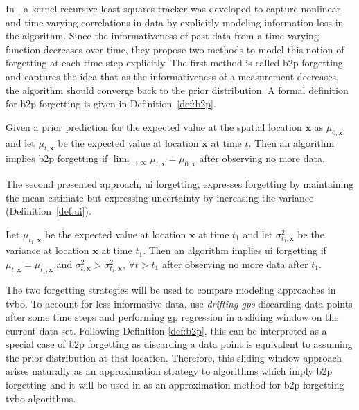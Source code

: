 In \textcite{Vaerenbergh_2012}, a kernel recursive least squares tracker was developed to capture nonlinear and time-varying correlations in data by explicitly modeling information loss in the algorithm. Since the informativeness of past data from a time-varying function decreases over time, they propose two methods to model this notion of forgetting at each time step explicitly. The first method is called \gls{b2p} forgetting and captures the idea that as the informativeness of a measurement decreases, the algorithm should converge back to the prior distribution. A formal definition for \gls{b2p} forgetting is given in Definition~\ref{def:b2p}.
\begin{definition}
Given a prior prediction for the expected value at the spatial location $\mathbf{x}$ as $\mu_{0,\mathbf{x}}$ and let $\mu_{t,\mathbf{x}}$ be the expected value at location $\mathbf{x}$ at time $t$. Then an algorithm implies \gls{b2p} forgetting if $\lim_{t\to\infty}\mu_{t,\mathbf{x}} = \mu_{0,\mathbf{x}}$ after observing no more data.
\label{def:b2p}
\end{definition}
\noindent The second presented approach, \gls{ui} forgetting, expresses forgetting by maintaining the mean estimate but expressing uncertainty by increasing the variance (Definition~\ref{def:ui}). 
\begin{definition}
Let $\mu_{t_1,\mathbf{x}}$ be the expected value at location $\mathbf{x}$ at time $t_1$ and let $\sigma_{t_1,\mathbf{x}}^2$ be the variance at location $\mathbf{x}$ at time $t_1$. Then an algorithm implies \gls{ui} forgetting if $\mu_{t,\mathbf{x}} = \mu_{t_1,\mathbf{x}}$ and $\sigma_{t,\mathbf{x}}^2 > \sigma_{t_1,\mathbf{x}}^2,\, \forall t>t_1$ after observing no more data after $t_1$.
\label{def:ui}
\end{definition}
\noindent The two forgetting strategies will be used to compare modeling approaches in \gls{tvbo}.
To account for less informative data, \textcite{Meier_2016} use \emph{drifting \glspl{gp}} discarding data points after some time steps and performing \gls{gp} regression in a sliding window on the current data set. Following Definition \ref{def:b2p}, this can be interpreted as a special case of \gls{b2p} forgetting as discarding a data point is equivalent to assuming the prior distribution at that location. Therefore, this sliding window approach arises naturally as an approximation strategy to algorithms which imply \gls{b2p} forgetting and it will be used in  as an approximation method for \gls{b2p} forgetting \gls{tvbo} algorithms.

